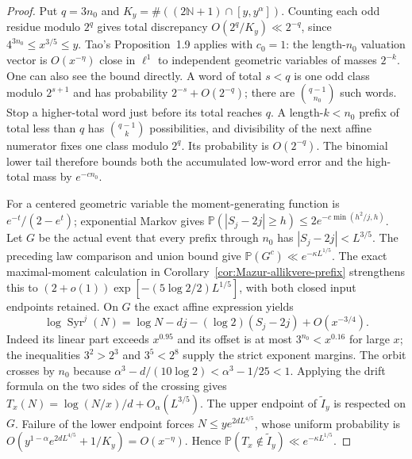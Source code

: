 \begin{proof}
Put $q=3n_0$ and $K_y=\#((2\mathbb N+1)\cap[y,y^\alpha])$.
Counting each odd residue modulo $2^q$ gives total discrepancy
$O(2^q/K_y)\ll2^{-q}$, since $4^{3n_0}\le x^{3/5}\le y$.
Tao's Proposition~1.9 \cite{Tao2026v7} applies with $c_0=1$:
the length-$n_0$ valuation vector is $O(x^{-\eta})$ close in
$\ell^1$ to independent geometric variables of masses $2^{-k}$.
One can also see the bound directly. A word of total $s<q$ is
one odd class modulo $2^{s+1}$ and has probability
$2^{-s}+O(2^{-q})$; there are $\binom{q-1}{n_0}$ such words.
Stop a higher-total word just before its total reaches $q$.
A length-$k<n_0$ prefix of total less than $q$ has
$\binom{q-1}{k}$ possibilities, and divisibility of the next affine
numerator fixes one class modulo $2^q$. Its probability is
$O(2^{-q})$. The binomial lower tail therefore bounds both the
accumulated low-word error and the high-total mass by $e^{-cn_0}$.

For a centered geometric variable the moment-generating function is
$e^{-t}/(2-e^t)$; exponential Markov gives
$\mathbb P(|S_j-2j|\ge h)\le2e^{-c\min(h^2/j,h)}$.
Let $G$ be the actual event that every prefix through $n_0$ has
$|S_j-2j|<L^{3/5}$. The preceding law comparison and union bound
give $\mathbb P(G^c)\ll e^{-\kappa L^{1/5}}$.
The exact maximal-moment calculation in
Corollary~\ref{cor:Mazur-allikvere-prefix} strengthens this to
$(2+o(1))\exp[-(5\log2/2)L^{1/5}]$, with both closed input
endpoints retained.
On $G$ the exact affine expression yields
\[
 \log\operatorname{Syr}^j(N)
 =\log N-dj-(\log2)(S_j-2j)+O(x^{-3/4}).
\]
Indeed its linear part exceeds $x^{0.95}$ and its offset is at most
$3^{n_0}<x^{0.16}$ for large $x$; the inequalities
$3^2>2^3$ and $3^5<2^8$ supply the strict exponent margins.
The orbit crosses by $n_0$ because
$\alpha^3-d/(10\log2)<\alpha^3-1/25<1$.
Applying the drift formula on the two sides of the crossing gives
$T_x(N)=\log(N/x)/d+O_\alpha(L^{3/5})$.
The upper endpoint of $\widetilde I_y$ is respected on $G$.
Failure of the lower endpoint forces
$N\le y e^{2dL^{4/5}}$, whose uniform probability is
$O(y^{1-\alpha}e^{2dL^{4/5}}+1/K_y)=O(x^{-\eta})$.
Hence $\mathbb P(T_x\notin\widetilde I_y)\ll e^{-\kappa L^{1/5}}$.


\end{proof}
